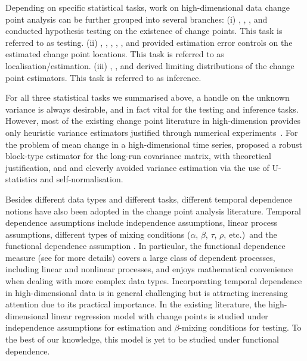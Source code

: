 \documentclass[11pt]{article}
\theoremstyle{plain}
\theoremstyle{definition}
\begin{document}
Depending on specific statistical tasks, work on high-dimensional data change point analysis can be further grouped into several branches: (i) \cite{chen2021inference}, \cite{yuchen2021}, \cite{wangzhushaovolgushev2021AoS}, \cite{zhang2021adaptive} and \cite{wang2022optimal} conducted hypothesis testing on the existence of change points.  This task is referred to as testing.  (ii) \cite{lee2016lasso}, \cite{kaul2019efficient}, \cite{wang2021statistically}, \cite{rinaldo2021localizing}, \cite{chen2021inference}, \cite{yuchen2021} and \cite{kaul2021inference} provided estimation error controls on the estimated change point locations.  This task is referred to as localisation/estimation.  (iii) \cite{bai2010common}, \cite{wangshao2020}, \cite{kaul2021inference} and \cite{chen2021inference} derived limiting distributions of the change point estimators.  This task is referred to as inference.  


For all three statistical tasks we summarised above, a handle on the unknown variance is always desirable, and in fact vital for the testing and inference tasks. However, most of the existing change point literature in high-dimension provides only heuristic variance estimators justified through numerical experiments~\citep[e.g.][]{kaul2021inference, wang2022optimal}. For the problem of mean change in a high-dimensional time series, \cite{chen2021inference} proposed a robust block-type estimator for the long-run covariance matrix, with theoretical justification, and \cite{zhang2021adaptive} and \cite{wangzhushaovolgushev2021AoS} cleverly avoided variance estimation via the use of U-statistics and self-normalisation.

Besides different data types and different tasks, different temporal dependence notions have also been adopted in the change point analysis literature.  Temporal dependence assumptions include independence assumptions, linear process assumptions, different types of mixing conditions ($\alpha$, $\beta$, $\tau$, $\rho$, etc.)~and the functional dependence assumption \citep{wu2005nonlinear}. In particular, the functional dependence measure (see  for more details) covers a large class of dependent processes, including linear and nonlinear processes, and enjoys mathematical convenience when dealing with more complex data types.  Incorporating temporal dependence in high-dimensional data is in general challenging but is attracting increasing attention due to its practical importance. In the existing literature, the high-dimensional linear regression model with change points is studied under independence assumptions \citep{lee2016lasso, kaul2019efficient, wang2021statistically, rinaldo2021localizing} for estimation and $\beta$-mixing conditions \citep{wang2022optimal} for testing. To the best of our knowledge, this model is yet to be studied under functional dependence.
\end{document}
